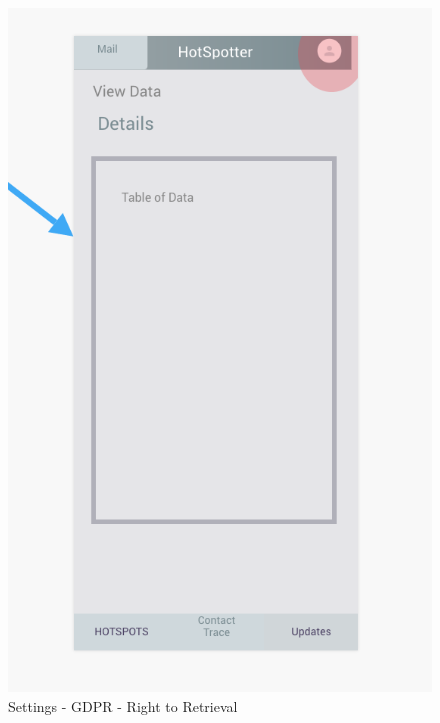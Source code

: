 \documentclass{scrreprt}
\begin{document}
\begin{figure}[H]
	\centering
	\includegraphics[page=1, width=0.9\linewidth]{COMP30830-Table}
	\caption{Settings - GDPR - Right to Retrieval}
	\label{Table}
\end{figure}
\end{document}
